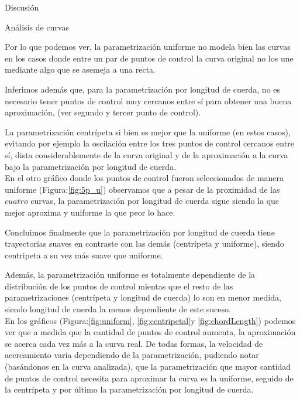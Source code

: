 \begin{section}{Discusión}
\begin{subsection}{Análisis de curvas}
	
	Por lo que podemos ver, la parametrización uniforme no modela bien las curvas en los casos donde entre un par de puntos de control la curva original no los une mediante algo que se asemeja a una recta.
	
	Inferimos además que, para la parametrización por longitud de cuerda, no es necesario tener puntos de control muy cercanos entre sí para obtener una buena aproximación, (ver segundo y tercer punto de control).
	
	La parametrización centrípeta si bien es mejor que la uniforme (en estos casos), evitando por ejemplo la oscilación entre los tres puntos de control cercanos entre sí, dista considerablemente de la curva original y de la aproximación a la curva bajo la parametrización por longitud de cuerda.\\
	
	En el otro gráfico donde los puntos de control fueron seleccionados de manera uniforme (Figura:\ref{fig:5p_u}) observamos que a pesar de la proximidad de las $cuatro$ curvas, la parametrización por longitud de cuerda sigue siendo la que mejor aproxima y uniforme la que peor lo hace.
	
	Concluimos finalmente que la parametrización por longitud de cuerda tiene trayectorias suaves en contraste con las demás (centrípeta y uniforme), siendo centripeta a su vez más suave que uniforme. 
	
	Además, la parametrización uniforme es totalmente dependiente de la distribución de los puntos de control mientas que el resto de las parametrizaciones (centrípeta y longitud de cuerda) lo son en menor medida, siendo longitud de cuerda la menos dependiente de este suceso.\\
	
	En los gráficos (Figura:\ref{fig:uniform}, \ref{fig:centripetal}y \ref{fig:chordLength}) podemos ver que a medida que la cantidad de puntos de control aumenta, la aproximación se acerca cada vez más a la curva real. De todas formas, la velocidad de acercamiento varía dependiendo de la parametrización, pudiendo notar (basándonos en la curva analizada), que la parametrización que mayor cantidad de puntos de control necesita para aproximar la curva es la uniforme, seguido de la centrípeta y por último la parametrización por longitud de cuerda.
	

\end{subsection}
\end{section}
